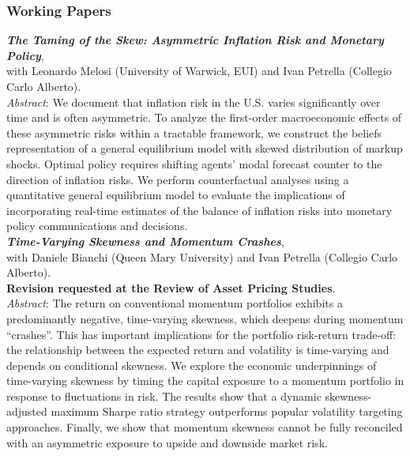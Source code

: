 \documentclass[a4paper,12pt]{article}
\begin{document}
\subsubsection*{Working Papers}
\textit{\textbf{The Taming of the Skew: Asymmetric Inflation Risk and Monetary Policy}},\\ with Leonardo Melosi (University of Warwick, EUI) and Ivan Petrella (Collegio Carlo Alberto).\\[.2em]
\textit{Abstract}: We document that inflation risk in the U.S. varies significantly over time and is often asymmetric. To analyze the first-order macroeconomic effects of these asymmetric risks within a tractable framework, we construct the beliefs representation of a general equilibrium model with skewed distribution of markup shocks. Optimal policy requires shifting agents’ modal forecast counter to the direction of inflation risks. We perform counterfactual analyses using a quantitative general equilibrium model to evaluate the implications of incorporating real-time estimates of the balance of inflation risks into monetary policy communications and decisions.\\[.5em]

\textit{\textbf{Time-Varying Skewness and Momentum Crashes}},\\ with Daniele Bianchi (Queen Mary University) and Ivan Petrella (Collegio Carlo Alberto).\\\textbf{Revision requested at the Review of Asset Pricing Studies}.\\[.2em]\textit{Abstract}:
The return on conventional momentum portfolios exhibits a predominantly negative, time-varying skewness, which deepens during momentum ``crashes''. This has important implications for the portfolio risk-return trade-off: the relationship between the expected return and volatility is time-varying and depends on conditional skewness. We explore the economic underpinnings of time-varying skewness by timing the capital exposure to a momentum portfolio in response to fluctuations in risk. The results show that a dynamic skewness-adjusted maximum Sharpe ratio strategy outperforms popular volatility targeting approaches. Finally, we show that momentum skewness cannot be fully reconciled with an asymmetric exposure to upside and downside market risk.\\[.5em]
\end{document}
